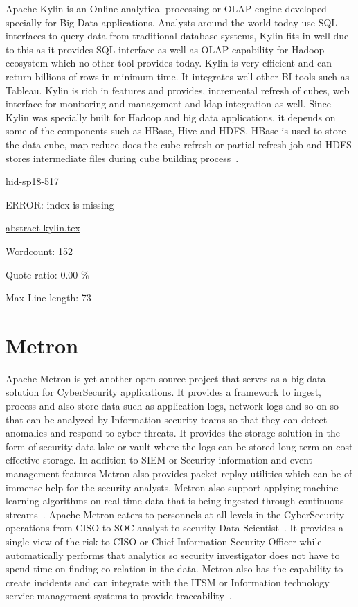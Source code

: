 Apache Kylin is an Online analytical processing or OLAP engine developed 
specially for Big Data applications. Analysts around the world today 
use SQL interfaces to query data from traditional database systems, 
Kylin fits in well due to this as it provides SQL interface as well 
as OLAP capability for Hadoop ecosystem which no other tool provides 
today. Kylin is very efficient and can return billions of rows in 
minimum time. It integrates well other BI tools such as Tableau. 
Kylin is rich in features and provides, incremental refresh of cubes, 
web interface for monitoring and management and ldap integration as 
well. Since Kylin was specially built for Hadoop and big data 
applications, it depends on some of the components such as HBase, 
Hive and HDFS. HBase is used to store the data cube, map reduce does 
the cube refresh or partial refresh job and HDFS stores intermediate 
files during cube building process~\cite{hid-sp18-517-ApacheKylin}.



\begin{IU}

hid-sp18-517

ERROR: index is missing

\href{https://github.com/cloudmesh-community/hid-sp18-517/blob/master//technology/abstract-kylin.tex}{abstract-kylin.tex}

 

Wordcount: 152


Quote ratio: 0.00 \%
 
Max Line length: 73
\end{IU}

\section{Metron}

Apache Metron is yet another open source project that serves as a big data
solution for CyberSecurity applications. It provides a framework to ingest,
process and also store data such as application logs, network logs and so on so
that can be analyzed by Information security teams so that they can detect
anomalies and respond to cyber threats. It provides the storage solution in the
form of security data lake or vault where the logs can be stored long term on
cost effective storage. In addition to SIEM or Security information and event
management features Metron also provides packet replay utilities which can be of
immense help for the security analysts.  Metron also support applying machine
learning algorithms on real time data that is being ingested through continuous
streams~\cite{hid-sp18-517-metron-apache}.  Apache Metron caters to personnels
at all levels in the CyberSecurity operations from CISO to SOC analyst to
security Data Scientist~\cite{hid-sp18-517-metron-hortonworks}.  It provides a
single view of the risk to CISO or Chief Information Security Officer while
automatically performs that analytics so security investigator does not have to
spend time on finding co-relation in the data. Metron also has the capability to
create incidents and can integrate with the ITSM or Information technology
service management systems to provide
traceability~\cite{hid-sp18-517-metron-hortonworks}.


